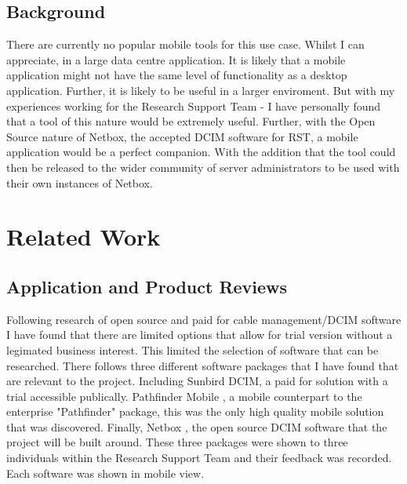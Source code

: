 \documentclass [12pt,letterpaper]{article}
\begin{document}
\subsection{Background}
\label{sec:background}

There are currently no popular mobile tools for this use case. Whilst I can appreciate, in a large data centre application. It is likely that a mobile application might not have the same level of functionality as a desktop application. Further, it is likely to be useful in a larger enviroment. But with my experiences working for the Research Support Team - I have personally found that a tool of this nature would be extremely useful. Further, with the Open Source nature of Netbox, the accepted DCIM software for RST, a mobile application would be a perfect companion. With the addition that the tool could then be released to the wider community of server administrators to be used with their own instances of Netbox.

\section{Related Work}
\subsection{Application and Product Reviews}
\label{sec:app_reviews}

Following research of open source and paid for cable management/DCIM software I have found that there are limited options that allow for trial version without a legimated business interest. This limited the selection of software that can be researched. There follows three different software packages that I have found that are relevant to the project. Including Sunbird DCIM\cite{Sunbird}, a paid for solution with a trial accessible publically. Pathfinder Mobile \cite{Pathfinder}, a mobile counterpart to the enterprise "Pathfinder" package, this was the only high quality mobile solution that was discovered. Finally, Netbox \cite{Netbox}, the open source DCIM software that the project will be built around. These three packages were shown to three individuals within the Research Support Team and their feedback was recorded. Each software was shown in mobile view. 
\end{document}
